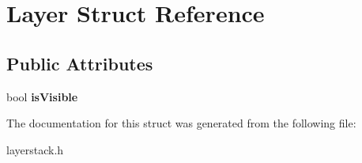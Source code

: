 \hypertarget{struct_layer}{\section{Layer Struct Reference}
\label{struct_layer}
}
\subsection*{Public Attributes}
\begin{DoxyCompactItemize}
\item 
\hypertarget{struct_layer_a69536f946617c35afb45929f8bc57062}{bool {\bfseries is\-Visible}}\label{struct_layer_a69536f946617c35afb45929f8bc57062}

\end{DoxyCompactItemize}


The documentation for this struct was generated from the following file\-:\begin{DoxyCompactItemize}
\item 
layerstack.\-h\end{DoxyCompactItemize}
